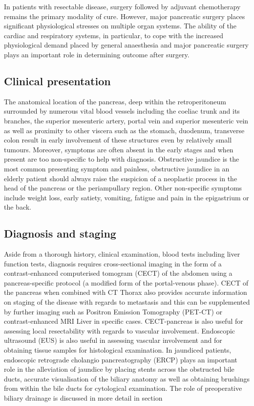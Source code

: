 In patients with resectable disease, surgery \parencite{sener_pancreatic_1999, sohn_resected_2000,geer_prognostic_1993} followed by adjuvant chemotherapy \parencite{neoptolemos_randomized_2004, neoptolemos_adjuvant_2009} remains the primary modality of cure. However, major pancreatic surgery places significant physiological stresses on multiple organ systems. The ability of the cardiac and respiratory systems, in particular, to cope with the increased physiological demand placed by general anaesthesia and major pancreatic surgery plays an important role in determining outcome after surgery.

\subsection{Clinical presentation}

The anatomical location of the pancreas, deep within the retroperitoneum surrounded by numerous vital blood vessels including the coeliac trunk and its branches, the superior mesenteric artery, portal vein and superior mesenteric vein as well as proximity to other viscera such as the stomach, duodenum, transverse colon result in early involvement of these structures even by relatively small tumours. Moreover, symptoms are often absent in the early stages and when present are too non-specific to help with diagnosis. Obstructive jaundice is the most common presenting symptom and painless, obstructive jaundice in an elderly patient should always raise the suspicion of a neoplastic process in the head of the pancreas or the periampullary region. Other non-specific symptoms include weight loss, early satiety, vomiting, fatigue and pain in the epigastrium or the back. 
 
\subsection{Diagnosis and staging}

Aside from a thorough history, clinical examination, blood tests including liver function tests, diagnosis requires cross-sectional imaging in the form of a contrast-enhanced computerised tomogram (CECT) of the abdomen using a pancreas-specific protocol (a modified form of the portal-venous phase). CECT of the pancreas when combined with CT Thorax also provides accurate information on staging of the disease with regards to metastasis and this can be supplemented by further imaging such as Positron Emission Tomography (PET-CT) or contrast-enhanced MRI Liver in specific cases. CECT-pancreas is also useful for assessing local resectability with regards to vascular involvement. Endoscopic ultrasound (EUS) is also useful in assessing vascular involvement and for obtaining tissue samples for histological examination. In jaundiced patients, endoscopic retrograde cholangio pancreatography (ERCP) plays an important role in the alleviation of jaundice by placing stents across the obstructed bile ducts, accurate visualisation of the biliary anatomy as well as obtaining brushings from within the bile ducts for cytological examination. The role of preoperative biliary drainage is discussed in more detail in section %
	
